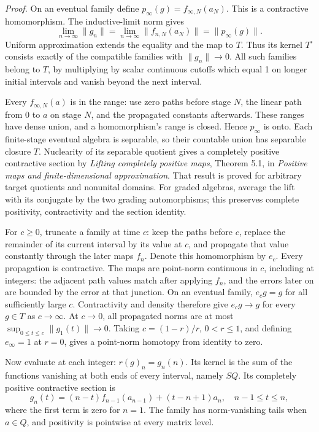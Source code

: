 \documentclass[
  11pt,
]{article}
\begin{document}
\emph{Proof.} On an eventual family define
\(p_\infty(g)=f_{\infty,N}(a_N)\). This is a contractive homomorphism.
The inductive-limit norm gives \[
\lim_{n\to\infty}\|g_n\|
=\lim_{n\to\infty}\|f_{n,N}(a_N)\|
=\|p_\infty(g)\|.
\tag{9.3}
\] Uniform approximation extends the equality and the map to \(T\). Thus
its kernel \(T^\circ\) consists exactly of the compatible families with
\(\|g_n\|\to0\). All such families belong to \(T\), by multiplying by
scalar continuous cutoffs which equal 1 on longer initial intervals and
vanish beyond the next interval.

Every \(f_{\infty,N}(a)\) is in the range: use zero paths before stage
\(N\), the linear path from 0 to \(a\) on stage \(N\), and the
propagated constants afterwards. These ranges have dense union, and a
homomorphism's range is closed. Hence \(p_\infty\) is onto. Each
finite-stage eventual algebra is separable, so their countable union has
separable closure \(T\). Nuclearity of its separable quotient gives a
completely positive contractive section by \emph{Lifting completely
positive maps}, Theorem 5.1, in \emph{Positive maps and
finite-dimensional approximation}. That result is proved for arbitrary
target quotients and nonunital domains. For graded algebras, average the
lift with its conjugate by the two grading automorphisms; this preserves
complete positivity, contractivity and the section identity.

For \(c\ge0\), truncate a family at time \(c\): keep the paths before
\(c\), replace the remainder of its current interval by its value at
\(c\), and propagate that value constantly through the later maps
\(f_n\). Denote this homomorphism by \(e_c\). Every propagation is
contractive. The maps are point-norm continuous in \(c\), including at
integers: the adjacent path values match after applying \(f_n\), and the
errors later on are bounded by the error at that junction. On an
eventual family, \(e_cg=g\) for all sufficiently large \(c\).
Contractivity and density therefore give \(e_cg\to g\) for every
\(g\in T\) as \(c\to\infty\). At \(c\to0\), all propagated norms are at
most \(\sup_{0\le t\le c}\|g_1(t)\|\to0\). Taking \(c=(1-r)/r\),
\(0<r\le1\), and defining \(e_\infty=1\) at \(r=0\), gives a point-norm
homotopy from identity to zero.

Now evaluate at each integer: \(r(g)_n=g_n(n)\). Its kernel is the sum
of the functions vanishing at both ends of every interval, namely
\(SQ\). Its completely positive contractive section is \[
g_n(t)=(n-t)f_{n-1}(a_{n-1})
+(t-n+1)a_n,\quad n-1\le t\le n,
\tag{9.4}
\] where the first term is zero for \(n=1\). The family has
norm-vanishing tails when \(a\in Q\), and positivity is pointwise at
every matrix level.
\end{document}
